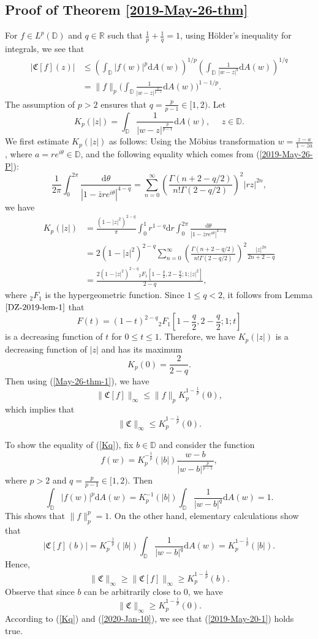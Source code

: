 \documentclass[a4paper,12pt]{amsart}
\theoremstyle{definition}
\numberwithin{equation}{section}
\newcommand{\ID}{{\mathbb D}}
\def\be{\begin{equation}}
\def\ee{\end{equation}}
\begin{document}
\subsection*{Proof of Theorem \ref{2019-May-26-thm}}
For $f\in L^p(\ID)$ and $q\in\mathbb{R}$ such that $\frac{1}{p}+\frac{1}{q}=1$, using H\"older's inequality for integrals, we see that
\begin{align}\label{May-26-thm-1}
|\mathfrak{C}[f](z)| &\leq \left(\int_{\ID}|f(w)|^p\mathrm{d}A(w) \right)^{1/p}\left(\int_{\ID}\frac{1}{|w-z|^q}\mathrm{d}A(w) \right)^{1/q}\\ \nonumber
 &=\|f\|_{p}\bigg(\int_{\ID}\frac{1}{|w-z|^{\frac{p}{p-1}}}\mathrm{d}A(w) \bigg)^{1-1/p}.
\end{align}
The assumption of $p>2$ ensures that $q=\frac{p}{p-1}\in[1, 2)$. Let
\be\label{Iq}
K_p(|z|)=\int_{\ID}\frac{1}{|w-z|^{\frac{p}{p-1}}}\mathrm{d}A(w) , \ \ \ \ \ \ z\in\ID.
\ee
We first estimate $K_p(|z|)$ as follows: Using the M\"obius transformation $w=\frac{z-a}{1-\bar{z}a}$, where $a=re^{i\theta}\in \ID$, and
the following equality which comes from (\ref{2019-May-26-P}):
$$\frac{1}{2\pi}\int_0^{2\pi}\frac{\mathrm{d}\theta}{|1-\bar{z}re^{i\theta}|^{4-q}}=\sum\limits_{n=0}^{\infty}\left(\frac{\Gamma(n+2-q/2)}{n!\Gamma(2-q/2)}\right)^2|rz|^{2n},$$
we have
\begin{align*}
K_p(|z|) &= \frac{(1-|z|^2)^{2-q}}{\pi}\int_0^1r^{1-q}\mathrm{d}r\int_0^{2\pi}\frac{\mathrm{d}\theta}{|1-\bar{z}re^{i\theta}|^{4-q}}\\
 &=2 (1-|z|^2)^{2-q}\sum\limits_{n=0}^{\infty}\left(\frac{\Gamma(n+2-q/2)}{n!\Gamma(2-q/2)}\right)^2\frac{|z|^{2n}}{2n+2-q}\\
 &= \frac{2  \left(1-|z|^2\right)^{2-q} {}_2F_1\left[1-\frac{q}{2}, 2-\frac{q}{2}; 1; |z|^2\right]}{2-q},
\end{align*}
where ${}_2F_1$ is the hypergeometric function.
Since $1\leq q<2$, it follows from Lemma $\ref{DZ-2019-lem-1}$ that
$$F(t)=\left(1-t\right)^{2-q} {}_2F_1\left[1-\frac{q}{2}, 2-\frac{q}{2}; 1; t\right]$$
is a decreasing function of $t$ for $0\leq t\leq1$. Therefore, we have  $K_p(|z|)$ is a decreasing function of $|z|$ and
has its maximum
$$K_p(0)= \frac{2}{2-q}.$$
Then using (\ref{May-26-thm-1}), we have
$$\|\mathfrak{C}[f]\|_{\infty}\leq\|f\|_p K_p^{1-\frac{1}{p}}(0),$$
which implies that
\be\label{Kq}\|\mathfrak{C}\|_{\infty}\leq K_p^{1-\frac{1}{p}}(0).\ee

To show the equality of (\ref{Kq}), fix $b\in\ID$ and consider the function
$$f(w)=K_p^{-\frac{1}{p}}(|b|)\frac{w-b}{|w-b|^{\frac{p}{p-1}}},$$
where $p>2$ and $q=\frac{p}{p-1}\in[1, 2)$.
Then
$$\int_{\ID}|f(w)|^p\mathrm{d}A(w)=K_p^{-1}(|b|)\int_{\ID}\frac{1}{|w-b|^q}\mathrm{d}A(w)=1.$$
This shows that $\|f\|_p^p=1$.
On the other hand, elementary calculations show that
$$\left|\mathfrak{C}[f](b)\right|=K_p^{-\frac{1}{p}}(|b|)\int_{\ID}\frac{1}{|w-b|^q}\mathrm{d}A(w)=K_p^{1-\frac{1}{p}}(|b|).$$
Hence,
$$\|\mathfrak{C}\|_{\infty}\geq\|\mathfrak{C}[f]\|_{\infty}\geq K_p^{1-\frac{1}{p}}(b).$$
Observe that since $b$ can be arbitrarily close to $0$, we have
\be\label{2020-Jan-10}\|\mathfrak{C}\|_{\infty}\geq K_p^{1-\frac{1}{p}}(0).\ee
According to (\ref{Kq}) and (\ref{2020-Jan-10}), we see that (\ref{2019-May-20-1}) holds true.
\end{document}
